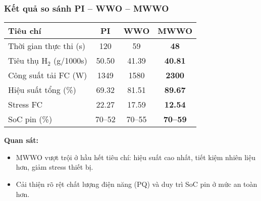 \begin{frame}
    \frametitle{Kết quả so sánh PI -- WWO -- MWWO}

    \begin{table}[h]
        \centering
        \begin{tabular}{lccc}
            \hline
            \textbf{Tiêu chí} & \textbf{PI} & \textbf{WWO} & \textbf{MWWO} \\
            \hline
            Thời gian thực thi (s)     & 120   & 59    & \textbf{48}    \\
            Tiêu thụ H$_2$ (g/1000s)   & 50.50 & 41.39 & \textbf{40.81} \\
            Công suất tải FC (W)       & 1349  & 1580  & \textbf{2300}  \\
            Hiệu suất tổng (\%)        & 69.32 & 81.51 & \textbf{89.67} \\
            Stress FC                  & 22.27 & 17.59 & \textbf{12.54} \\
            SoC pin (\%)               & 70--52 & 70--55 & \textbf{70--59} \\
            \hline
        \end{tabular}
    \end{table}

    \vspace{0.5em}
    \textbf{Quan sát:}
    \begin{itemize}
        \item MWWO vượt trội ở hầu hết tiêu chí: hiệu suất cao nhất, tiết kiệm nhiên liệu hơn, giảm stress thiết bị.
        \item Cải thiện rõ rệt chất lượng điện năng (PQ) và duy trì SoC pin ở mức an toàn hơn.
    \end{itemize}
\end{frame}
